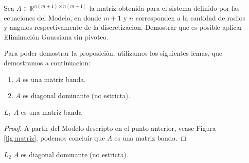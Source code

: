 \begin{proposition}
    Sea $A \in \mathbb{R}^{n(m+1) \times n(m+1)}$ la matriz obtenida para el sistema definido por las ecuaciones del Modelo, en donde $m+1$ y $n$ corresponden a la cantidad de radios y angulos respectivamente de la discretizacion. Demostrar que es posible aplicar Eliminación Gaussiana sin pivoteo.
\end{proposition}

Para poder demostrar la proposición, utilizamos los siguientes lemas, que demostramos a continuacion:

  \begin{enumerate}[label=(\subscript{L}{\arabic*})]
    \item $A$ es una matriz banda.
    \item $A$ es diagonal dominante (no estricta).

  \end{enumerate}

  \begin{customlemma}{$L_{1}$}
    $A$ es una matriz banda
  \end{customlemma}

  \begin{proof}
    A partir del Modelo descripto en el punto anterior, vease Figura \ref{fig:matriz}, podemos concluir que $A$ es una matriz banda.
  \end{proof}

  \begin{customlemma}{$L_{2}$}
    $A$ es diagonal dominante (no estricta).
  \end{customlemma}

